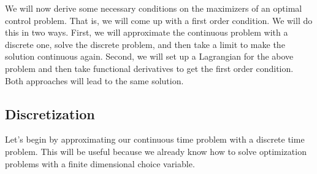 We will now derive some necessary conditions on the maximizers of an
optimal control problem. That is, we will come up with a first
order condition. We will do this in two ways. First, we will
approximate the continuous problem with a discrete one, solve the
discrete problem, and then take a limit to make the solution
continuous again. Second, we will set up a Lagrangian for the above
problem and then take functional derivatives to get the first order
condition. Both approaches will lead to the same solution.

\subsection{Discretization}

Let's begin by approximating our continuous time problem with a
discrete time problem. This will be useful because we already know how
to solve optimization problems with a finite dimensional choice
variable.

